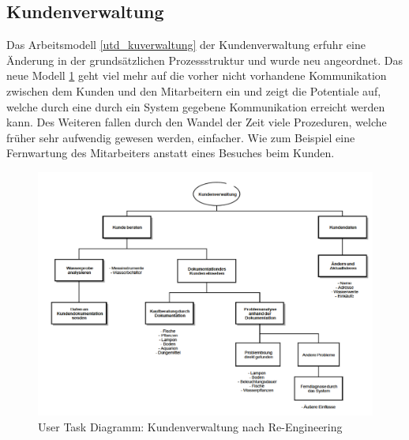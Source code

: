 \subsection{Kundenverwaltung}
Das Arbeitsmodell \ref{utd_kuverwaltung} der Kundenverwaltung erfuhr eine Änderung in der grundsätzlichen Prozessstruktur und wurde neu angeordnet. Das neue Modell \ref{utd_kuverwaltung_reengineering} geht viel mehr auf die vorher nicht vorhandene Kommunikation zwischen dem Kunden und den Mitarbeitern ein und zeigt die Potentiale auf, welche durch eine durch ein System gegebene Kommunikation erreicht werden kann. Des Weiteren fallen durch den Wandel der Zeit viele Prozeduren, welche früher sehr aufwendig gewesen werden, einfacher. Wie zum Beispiel eine Fernwartung des Mitarbeiters anstatt eines Besuches beim Kunden.

\begin{figure}
	\centering
	\includegraphics[width=\linewidth,height=\textheight,
keepaspectratio]{utd_kuverwaltung_reenginered}
	\caption{User Task Diagramm: Kundenverwaltung nach Re-Engineering}
	\label{utd_kuverwaltung_reengineering}
\end{figure}

